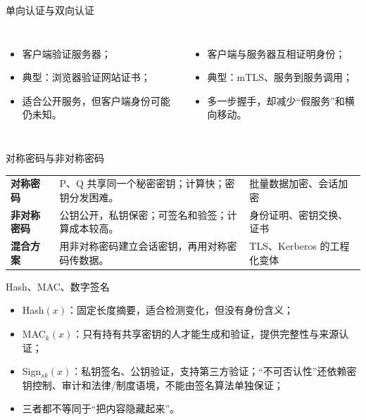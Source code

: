 \documentclass[UTF8,fontset=none,aspectratio=169,10pt]{beamer}
\begin{document}
\begin{frame}{单向认证与双向认证}
\begin{columns}[T,onlytextwidth]
\begin{itemize}
  \item 客户端验证服务器；
  \item 典型：浏览器验证网站证书；
  \item 适合公开服务，但客户端身份可能仍未知。
\end{itemize}
\begin{itemize}
  \item 客户端与服务器互相证明身份；
  \item 典型：mTLS、服务到服务调用；
  \item 多一步握手，却减少“假服务”和横向移动。
\end{itemize}
\end{columns}
\vfill
{}
\end{frame}


\begin{frame}{对称密码与非对称密码}
\begin{tabularx}{\linewidth}{>{\bfseries}p{3.1cm}XX}
\toprule
对称密码 & P、Q 共享同一个秘密密钥；计算快；密钥分发困难。 & 批量数据加密、会话加密 \\
非对称密码 & 公钥公开，私钥保密；可签名和验签；计算成本较高。 & 身份证明、密钥交换、证书 \\
混合方案 & 用非对称密码建立会话密钥，再用对称密码传数据。 & TLS、Kerberos 的工程化变体 \\
\bottomrule
\end{tabularx}
\end{frame}

\begin{frame}{Hash、MAC、数字签名}
\begin{itemize}
  \item Hash$(x)$：固定长度摘要，适合检测变化，但没有身份含义；
  \item MAC$_k(x)$：只有持有共享密钥的人才能生成和验证，提供完整性与来源认证；
  \item Sign$_{sk}(x)$：私钥签名、公钥验证，支持第三方验证；“不可否认性”还依赖密钥控制、审计和法律/制度语境，不能由签名算法单独保证；
  \item 三者都不等同于“把内容隐藏起来”。
\end{itemize}
\vfill
\begin{center}
\end{center}
\end{frame}
\end{document}
